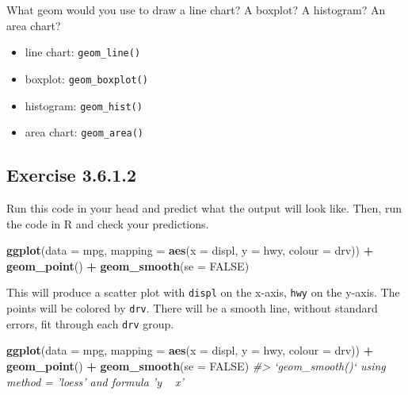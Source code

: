 \documentclass[]{book}
\newenvironment{Shaded}{\begin{snugshade}}{\end{snugshade}}
\newcommand{\CommentTok}[1]{\textcolor[rgb]{0.56,0.35,0.01}{\textit{#1}}}
\newcommand{\DataTypeTok}[1]{\textcolor[rgb]{0.13,0.29,0.53}{#1}}
\newcommand{\KeywordTok}[1]{\textcolor[rgb]{0.13,0.29,0.53}{\textbf{#1}}}
\newcommand{\NormalTok}[1]{#1}
\newcommand{\OperatorTok}[1]{\textcolor[rgb]{0.81,0.36,0.00}{\textbf{#1}}}
\newcommand{\OtherTok}[1]{\textcolor[rgb]{0.56,0.35,0.01}{#1}}
\newcommand{\StringTok}[1]{\textcolor[rgb]{0.31,0.60,0.02}{#1}}
\providecommand{\tightlist}{%
  \setlength{\itemsep}{0pt}\setlength{\parskip}{0pt}}
\theoremstyle{plain}
\theoremstyle{remark}
\begin{document}
What geom would you use to draw a line chart? A boxplot? A histogram? An area chart?

\begin{itemize}
\tightlist
\item
  line chart: \texttt{geom\_line()}
\item
  boxplot: \texttt{geom\_boxplot()}
\item
  histogram: \texttt{geom\_hist()}
\item
  area chart: \texttt{geom\_area()}
\end{itemize}

\hypertarget{exercise-3.6.1.2}{%
\subsection*{\texorpdfstring{Exercise {3.6.1.2}}{Exercise 3.6.1.2}}\label{exercise-3.6.1.2}}

Run this code in your head and predict what the output will look like. Then, run the code in R and check your predictions.

\begin{Shaded}
\begin{Highlighting}[]
\KeywordTok{ggplot}\NormalTok{(}\DataTypeTok{data =}\NormalTok{ mpg, }\DataTypeTok{mapping =} \KeywordTok{aes}\NormalTok{(}\DataTypeTok{x =}\NormalTok{ displ, }\DataTypeTok{y =}\NormalTok{ hwy, }\DataTypeTok{colour =}\NormalTok{ drv)) }\OperatorTok{+}
\StringTok{  }\KeywordTok{geom_point}\NormalTok{() }\OperatorTok{+}
\StringTok{  }\KeywordTok{geom_smooth}\NormalTok{(}\DataTypeTok{se =} \OtherTok{FALSE}\NormalTok{)}
\end{Highlighting}
\end{Shaded}

This will produce a scatter plot with \texttt{displ} on the x-axis, \texttt{hwy} on the y-axis.
The points will be colored by \texttt{drv}.
There will be a smooth line, without standard errors, fit through each \texttt{drv} group.

\begin{Shaded}
\begin{Highlighting}[]
\KeywordTok{ggplot}\NormalTok{(}\DataTypeTok{data =}\NormalTok{ mpg, }\DataTypeTok{mapping =} \KeywordTok{aes}\NormalTok{(}\DataTypeTok{x =}\NormalTok{ displ, }\DataTypeTok{y =}\NormalTok{ hwy, }\DataTypeTok{colour =}\NormalTok{ drv)) }\OperatorTok{+}
\StringTok{  }\KeywordTok{geom_point}\NormalTok{() }\OperatorTok{+}
\StringTok{  }\KeywordTok{geom_smooth}\NormalTok{(}\DataTypeTok{se =} \OtherTok{FALSE}\NormalTok{)}
\CommentTok{#> `geom_smooth()` using method = 'loess' and formula 'y ~ x'}
\end{Highlighting}
\end{Shaded}
\end{document}
